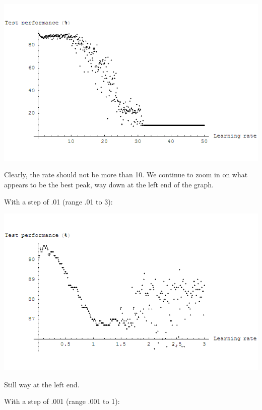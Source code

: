 \documentclass{article}
\begin{document}
\begin{enumerate}
\begin{enumerate}
      \begin{center}
        \includegraphics[scale=.5]{plot_test_1.png}
      \end{center}

      Clearly, the rate should not be more than 10. We continue to
      zoom in on what appears to be the best peak, way down at the
      left end of the graph.

      With a step of .01 (range .01 to 3):

      \begin{center}
        \includegraphics[scale=.5]{plot_test_01.png}
      \end{center}

      Still way at the left end.

      With a step of .001 (range .001 to 1):


\end{enumerate}
\end{enumerate}
\end{document}
